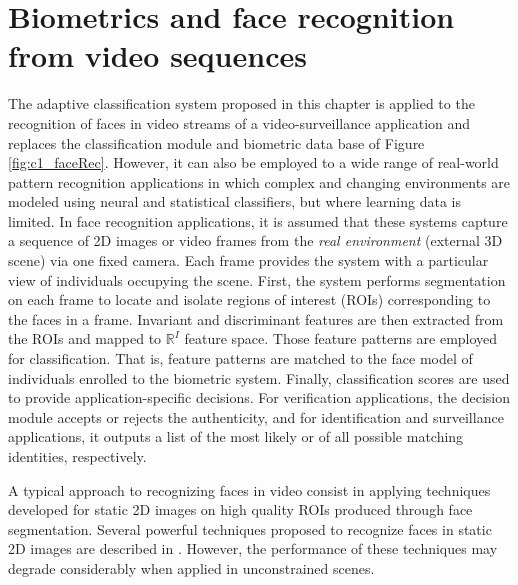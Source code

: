 \section{Biometrics and face recognition from video sequences}
\label{sec:c1_application}

The adaptive classification system proposed in this chapter is applied to the recognition of faces in video streams of a video-surveillance application and replaces the classification module and biometric data base of Figure \ref{fig:c1_faceRec}. However, it can also be employed to a wide range of real-world pattern recognition applications in which complex and changing environments are modeled using neural and statistical classifiers, but where learning data is limited. In face recognition applications, it is assumed that these systems capture a sequence of 2D images or video frames from the \emph{real environment} (external 3D scene) via one fixed camera. Each frame provides the system with a particular view of individuals occupying the scene. First, the system performs segmentation on each frame to locate and isolate regions of interest (ROIs) corresponding to the faces in a frame. Invariant and discriminant features are then extracted from the ROIs and mapped to $\mathbb{R}^I$ feature space. Those feature patterns are employed for classification. That is, feature patterns are matched to the face model of individuals enrolled to the biometric system. Finally, classification scores are used to provide application-specific decisions. For verification applications, the decision module accepts or rejects the authenticity, and for identification and surveillance applications, it outputs a list of the most likely or of all possible matching identities, respectively.

A typical approach to recognizing faces in video consist in applying techniques developed for static 2D images on high quality ROIs produced through face segmentation. Several powerful techniques proposed to recognize faces in static 2D images are described in \cite{zhang09, zhao03}. However, the performance of these techniques may degrade considerably when applied in unconstrained scenes.

\begin{figure*}[!t]
	\centering
  \caption{A general biometric system for face recognition. In this chapter, both classification module and biometric data base are replaced by the adaptive classification system}
	\label{fig:c1_faceRec}
\end{figure*}

